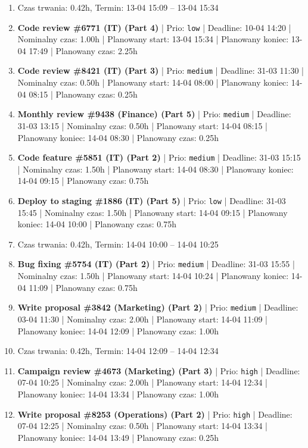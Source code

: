 {\begin{enumerate}
  \item [\textbf{PRZERWA}] Czas trwania: 0.42h, Termin: 13-04 15:09 -- 13-04 15:34
  \item [\textbf{14681}] \textbf{Code review \#6771 (IT) (Part 4)} | Prio: \texttt{low} | Deadline: 10-04 14:20 | Nominalny czas: 1.00h | Planowany start: 13-04 15:34 | Planowany koniec: 13-04 17:49 | Planowany czas: 2.25h
  \item [\textbf{14665}] \textbf{Code review \#8421 (IT) (Part 3)} | Prio: \texttt{medium} | Deadline: 31-03 11:30 | Nominalny czas: 0.50h | Planowany start: 14-04 08:00 | Planowany koniec: 14-04 08:15 | Planowany czas: 0.25h
  \item [\textbf{14656}] \textbf{Monthly review \#9438 (Finance) (Part 5)} | Prio: \texttt{medium} | Deadline: 31-03 13:15 | Nominalny czas: 0.50h | Planowany start: 14-04 08:15 | Planowany koniec: 14-04 08:30 | Planowany czas: 0.25h
  \item [\textbf{14643}] \textbf{Code feature \#5851 (IT) (Part 2)} | Prio: \texttt{medium} | Deadline: 31-03 15:15 | Nominalny czas: 1.50h | Planowany start: 14-04 08:30 | Planowany koniec: 14-04 09:15 | Planowany czas: 0.75h
  \item [\textbf{14697}] \textbf{Deploy to staging \#1886 (IT) (Part 5)} | Prio: \texttt{low} | Deadline: 31-03 15:45 | Nominalny czas: 1.50h | Planowany start: 14-04 09:15 | Planowany koniec: 14-04 10:00 | Planowany czas: 0.75h
  \item [\textbf{PRZERWA}] Czas trwania: 0.42h, Termin: 14-04 10:00 -- 14-04 10:25
  \item [\textbf{14631}] \textbf{Bug fixing \#5754 (IT) (Part 2)} | Prio: \texttt{medium} | Deadline: 31-03 15:55 | Nominalny czas: 1.50h | Planowany start: 14-04 10:24 | Planowany koniec: 14-04 11:09 | Planowany czas: 0.75h
  \item [\textbf{14673}] \textbf{Write proposal \#3842 (Marketing) (Part 2)} | Prio: \texttt{medium} | Deadline: 03-04 11:30 | Nominalny czas: 2.00h | Planowany start: 14-04 11:09 | Planowany koniec: 14-04 12:09 | Planowany czas: 1.00h
  \item [\textbf{PRZERWA}] Czas trwania: 0.42h, Termin: 14-04 12:09 -- 14-04 12:34
  \item [\textbf{14625}] \textbf{Campaign review \#4673 (Marketing) (Part 3)} | Prio: \texttt{high} | Deadline: 07-04 10:25 | Nominalny czas: 2.00h | Planowany start: 14-04 12:34 | Planowany koniec: 14-04 13:34 | Planowany czas: 1.00h
  \item [\textbf{14614}] \textbf{Write proposal \#8253 (Operations) (Part 2)} | Prio: \texttt{high} | Deadline: 07-04 12:25 | Nominalny czas: 0.50h | Planowany start: 14-04 13:34 | Planowany koniec: 14-04 13:49 | Planowany czas: 0.25h

\end{enumerate}}
